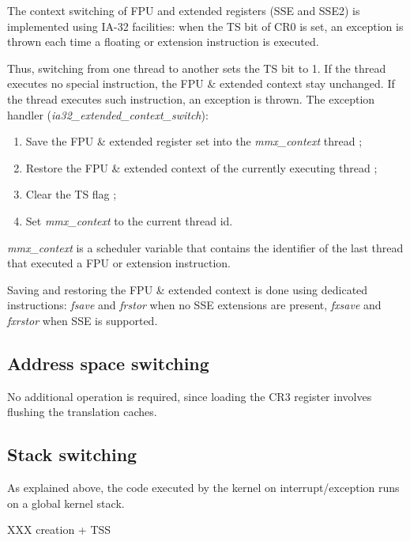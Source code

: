 The context switching of FPU and extended registers (SSE and SSE2) is
implemented using IA-32 facilities: when the TS bit of CR0 is set, an
exception is thrown each time a floating or extension instruction is
executed.

Thus, switching from one thread to another sets the TS bit to 1. If
the thread executes no special instruction, the FPU \& extended context
stay unchanged. If the thread executes such instruction, an exception
is thrown. The exception handler (\textit{ia32\_extended\_context\_switch}):

\begin{enumerate}
\item Save the FPU \& extended register set into the \textit{mmx\_context}
thread ;
\item Restore the FPU \& extended context of the currently executing thread ;
\item Clear the TS flag ;
\item Set \textit{mmx\_context} to the current thread id.
\end{enumerate}

\textit{mmx\_context} is a scheduler variable that contains the
identifier of the last thread that executed a FPU or extension
instruction.

Saving and restoring the FPU \& extended context is done using
dedicated instructions: \textit{fsave} and \textit{frstor} when no SSE
extensions are present, \textit{fxsave} and \textit{fxrstor} when SSE
is supported.

%
%

\subsection{Address space switching}

No additional operation is required, since loading the CR3 register
involves flushing the translation caches.

%
%

\subsection{Stack switching}

As explained above, the code executed by the kernel on
interrupt/exception runs on a global kernel stack.

XXX creation + TSS
